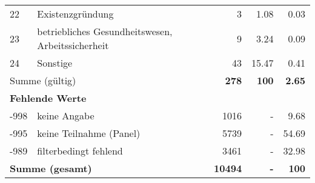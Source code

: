 \begin{longtable}{lXrrr}
        22 & \multicolumn{1}{X}{Existenzgründung} & %
          \num{3} &
          \num[round-mode=places,round-precision=2]{1,08} &
          \num[round-mode=places,round-precision=2]{0,03} \\

        23 & \multicolumn{1}{X}{betriebliches Gesundheitswesen, Arbeitssicherheit} & %
          \num{9} &
          \num[round-mode=places,round-precision=2]{3,24} &
          \num[round-mode=places,round-precision=2]{0,09} \\

        24 & \multicolumn{1}{X}{Sonstige} & %
          \num{43} &
          \num[round-mode=places,round-precision=2]{15,47} &
          \num[round-mode=places,round-precision=2]{0,41} \\

     \midrule
     \multicolumn{2}{l}{Summe (gültig)} &
       \textbf{\num{278}} &
     \textbf{100} &
       \textbf{\num[round-mode=places,round-precision=2]{2,65}} \\
     \multicolumn{5}{l}{\textbf{Fehlende Werte}}\\
       -998 &
       keine Angabe &
         \num{1016} &
        - &
         \num[round-mode=places,round-precision=2]{9,68} \\
       -995 &
       keine Teilnahme (Panel) &
         \num{5739} &
        - &
         \num[round-mode=places,round-precision=2]{54,69} \\
       -989 &
       filterbedingt fehlend &
         \num{3461} &
        - &
         \num[round-mode=places,round-precision=2]{32,98} \\
     \midrule
     \multicolumn{2}{l}{\textbf{Summe (gesamt)}} &
          \textbf{\num{10494}} &
        \textbf{-} &
        \textbf{100} \\
     \bottomrule
     \end{longtable}
     
